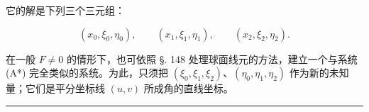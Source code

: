 它的解是下列三个三元组：

\[
 (x_0,\xi_0,\eta_0),
 \qquad (x_1,\xi_1,\eta_1),
 \qquad (x_2,\xi_2,\eta_2).
\]

在一般 $F\ne0$ 的情形下，也可依照 §. 148 处理球面线元的方法，建立一个与系统 (A*) 完全类似的系统。为此，只须把 $(\xi_0,\xi_1,\xi_2)$、$(\eta_0,\eta_1,\eta_2)$ 作为新的未知量；它们是平分坐标线 $(u,v)$ 所成角的直线坐标。



\begin{center}\rule{2.5cm}{0.4pt}\end{center}















